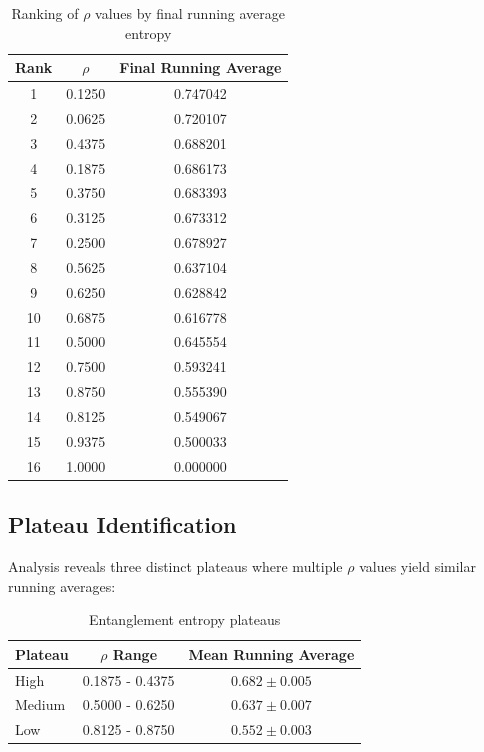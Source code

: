 \documentclass[11pt,a4paper]{article}
\begin{document}
\begin{table}[H]
\centering
\caption{Ranking of $\rho$ values by final running average entropy}
\label{tab:ranking}
\begin{tabular}{ccc}
\toprule
Rank & $\rho$ & Final Running Average \\
\midrule
1 & 0.1250 & 0.747042 \\
2 & 0.0625 & 0.720107 \\
3 & 0.4375 & 0.688201 \\
4 & 0.1875 & 0.686173 \\
5 & 0.3750 & 0.683393 \\
6 & 0.3125 & 0.673312 \\
7 & 0.2500 & 0.678927 \\
8 & 0.5625 & 0.637104 \\
9 & 0.6250 & 0.628842 \\
10 & 0.6875 & 0.616778 \\
11 & 0.5000 & 0.645554 \\
12 & 0.7500 & 0.593241 \\
13 & 0.8750 & 0.555390 \\
14 & 0.8125 & 0.549067 \\
15 & 0.9375 & 0.500033 \\
16 & 1.0000 & 0.000000 \\
\bottomrule
\end{tabular}
\end{table}

\subsection{Plateau Identification}

Analysis reveals three distinct plateaus where multiple $\rho$ values yield similar running averages:

\begin{table}[H]
\centering
\caption{Entanglement entropy plateaus}
\label{tab:plateaus}
\begin{tabular}{lcc}
\toprule
Plateau & $\rho$ Range & Mean Running Average \\
\midrule
High & 0.1875 - 0.4375 & $0.682 \pm 0.005$ \\
Medium & 0.5000 - 0.6250 & $0.637 \pm 0.007$ \\
Low & 0.8125 - 0.8750 & $0.552 \pm 0.003$ \\
\bottomrule
\end{tabular}
\end{table}
\end{document}
